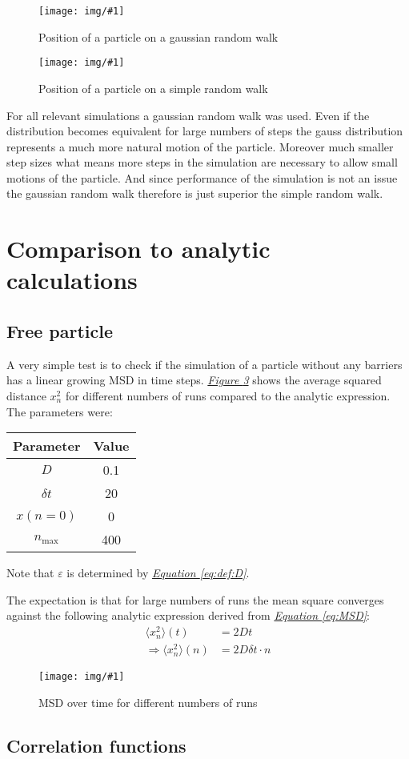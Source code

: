 \documentclass[a4paper, parskip=half]{scrartcl}
\newcommand{\myImage}[2]{
	\begin{figure}[ht!]
	\centering
	\texttt{[image: img/\#1]}
	\caption{#2}
	\label{pic:#1}
	\end{figure}
}
\newcommand{\myFigRef}[1]{\textit{\hyperref[#1]{Figure \ref*{#1}}}}
\newcommand{\myEqRef}[1]{\textit{\hyperref[eq:#1]{Equation \ref*{eq:#1}}}}
\begin{document}
\myImage{gauss_pos}{Position of a particle on a gaussian random walk}

\myImage{fixed_pos}{Position of a particle on a simple random walk}

For all relevant simulations a gaussian random walk was used. Even if the distribution becomes equivalent for large numbers of steps the gauss distribution represents a much more natural motion of the particle. Moreover much smaller step sizes what means more steps in the simulation are necessary to allow small motions of the particle. And since performance of the simulation is not an issue the gaussian random walk therefore is just superior the simple random walk.

\section{Comparison to analytic calculations}
\subsection{Free particle}
A very simple test is to check if the simulation of a particle without any barriers has a linear growing MSD in time steps. \myFigRef{pic:mean_square} shows the average squared distance $x_n^2$ for different numbers of runs compared to the analytic expression. The parameters were:
\begin{center}
\begin{tabular}{c|c}
Parameter & Value \\\hline
$D$ & 0.1 \\
$\delta t$ & 20 \\
$x(n=0)$ & 0 \\
$n_{\mathrm{max}}$ & 400
\end{tabular}
\end{center}
Note that $\varepsilon$ is determined by \myEqRef{def:D}.

The expectation is that for large numbers of runs the mean square converges against the following analytic expression derived from \myEqRef{MSD}:
\begin{align}
\langle x_n^2\rangle (t) &= 2 D t \\
\Rightarrow\langle x_n^2\rangle (n) &= 2 D \delta t \cdot n
\end{align}
\myImage{mean_square}{MSD over time for different numbers of runs}

\subsection{Correlation functions}
\end{document}

